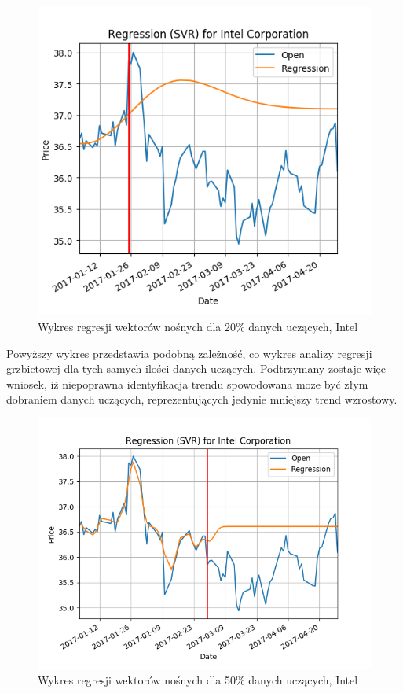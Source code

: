 \begin{figure}[ht]
\centering
\includegraphics[scale=0.4]{pictures/plots/intel_svr_20.png}
\caption{Wykres regresji wektorów nośnych dla 20\% danych uczących, Intel}
\label{fig:intel_svr_20}
\end{figure}

Powyższy wykres przedstawia podobną zależność, co wykres analizy regresji grzbietowej dla tych samych ilości danych uczących.
Podtrzymany zostaje więc wniosek, iż niepoprawna identyfikacja trendu spowodowana może być złym dobraniem danych uczących, reprezentujących jedynie mniejszy trend wzrostowy.\\

\newpage

\begin{figure}[ht]
\centering
\includegraphics[scale=0.5]{pictures/plots/intel_svr_50.png}
\caption{Wykres regresji wektorów nośnych dla 50\% danych uczących, Intel}
\label{fig:intel_svr_50}
\end{figure}

